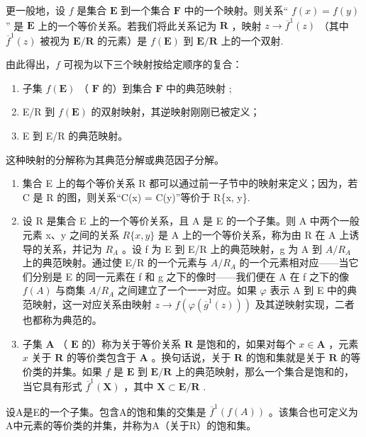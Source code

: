 更一般地，设 \(f\) 是集合 \(\mathbf{E}\) 到一个集合 \(\mathbf{F}\) 中的一个映射。则关系“ \(f(x) = f(y)\) '' 是 \(\mathbf{E}\) 上的一个等价关系。若我们将此关系记为 \(\mathbf{R}\) ，映射 \(z \to \overline{f}^1(z)\) （其中 \(\overline{f}^1(z)\) 被视为 \(\mathbf{E}/\mathbf{R}\) 的元素）是 \(f(\mathbf{E})\) 到 \(\mathbf{E}/\mathbf{R}\) 上的一个双射.

由此得出，\(f\) 可视为以下三个映射按给定顺序的复合：

\begin{enumerate}
\def\labelenumi{(\arabic{enumi})}
\item
  子集 \(f(\mathbf{E})\) （ \(\mathbf{F}\) 的）到集合 \(\mathbf{F}\) 中的典范映射 ;
\item
  E/R 到 \(f(\mathbf{E})\) 的双射映射，其逆映射刚刚已被定义；
\item
  E 到 E/R 的典范映射。
\end{enumerate}

这种映射的分解称为其典范分解或典范因子分解。

\begin{enumerate}
\def\labelenumi{\arabic{enumi}.}
\setcounter{enumi}{3}
\item
  集合 E 上的每个等价关系 R 都可以通过前一子节中的映射来定义；因为，若 C 是 R 的图，则关系“C(x) = C(y)”等价于 R\{x, y\}.
\item
  设 R 是集合 E 上的一个等价关系，且 A 是 E 的一个子集。则 A 中两个一般元素 x、y 之间的关系 \(R\{x, y\}\) 是 A 上的一个等价关系，称为由 R 在 A 上诱导的关系，并记为 \(R_{A}\) 。设 f 为 E 到 E/R 上的典范映射，g 为 A 到 \(A/R_{A}\) 上的典范映射。通过使 E/R 的一个元素与 \(A/R_{A}\) 的一个元素相对应——当它们分别是 E 的同一元素在 f 和 g 之下的像时——我们便在 A 在 f 之下的像 \(f(A)\) 与商集 \(A/R_{A}\) 之间建立了一个一一对应。如果 \(\varphi\) 表示 A 到 E 中的典范映射，这一对应关系由映射 \(z \to f(\varphi(\overline{g}^1(z)))\) 及其逆映射实现，二者也都称为典范的。
\item
  子集 \(\mathbf{A}\) （ \(\mathbf{E}\) 的）称为关于等价关系 \(\mathbf{R}\) 是饱和的，如果对每个 \(x \in \mathbf{A}\) ，元素 \(x\) 关于 \(\mathbf{R}\) 的等价类包含于 \(\mathbf{A}\) 。换句话说，关于 \(\mathbf{R}\) 的饱和集就是关于 \(\mathbf{R}\) 的等价类的并集。如果 \(f\) 是 \(\mathbf{E}\) 到 \(\mathbf{E} / \mathbf{R}\) 上的典范映射，那么一个集合是饱和的，当它具有形式 \(\overline{f}^1(\mathbf{X})\) ，其中 \(\mathbf{X} \subset \mathbf{E} / \mathbf{R}\) .
\end{enumerate}

设A是E的一个子集。包含A的饱和集的交集是 \(\overline{f}^{1}(f(A))\) 。该集合也可定义为A中元素的等价类的并集，并称为A（关于R）的饱和集。

